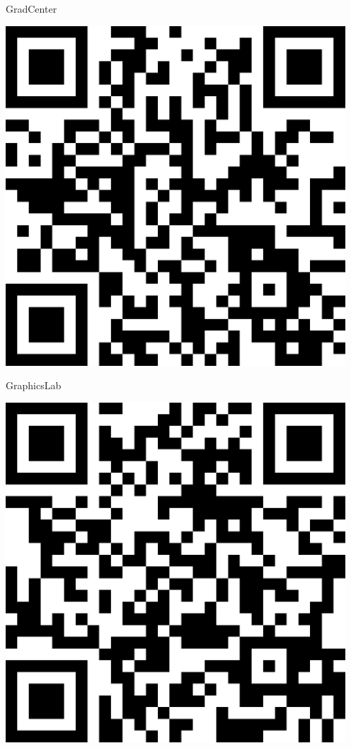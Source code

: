 \documentclass[letterpaper]{article}
\begin{document}
 \hfill{\small GradCenter} 

 \vspace{1in} 
 \pagebreak 
{} 
 \vspace*{\fill} 
 \begingroup 
 \centerline{\includegraphics[scale=1,width=5in,height=5in]{GraphicsLab.png}} 
 \endgroup 
 \vspace*{\fill} 

 \hfill{\small GraphicsLab} 

 \vspace{1in} 
 \pagebreak 
{} 
 \vspace*{\fill} 
 \begingroup 
 \centerline{\includegraphics[scale=1,width=5in,height=5in]{HonorsLab.png}} 
 \endgroup 
 \vspace*{\fill} 
\end{document}
